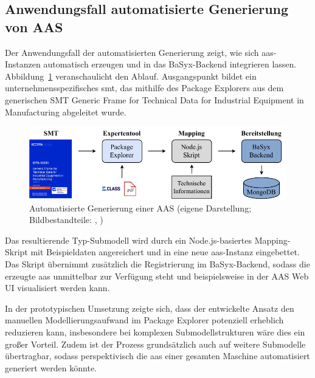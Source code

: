 \newpage
\subsection{Anwendungsfall automatisierte Generierung von AAS}

Der Anwendungsfall der automatisierten Generierung zeigt, wie sich \acs{aas}-Instanzen automatisch erzeugen und in das BaSyx-Backend integrieren lassen.
Abbildung~\ref{fig:AutomatisierteGenerierungAblauf} veranschaulicht den Ablauf.
Ausgangspunkt bildet ein unternehmensspezifisches \acs{smt}, das mithilfe des Package Explorers aus dem generischen SMT Generic Frame for Technical Data for Industrial Equipment in Manufacturing \cite{SpezifikaitonTechnischeDaten} abgeleitet wurde.

\begin{figure}[htbp]
    \centering
        \includegraphics[width=\textwidth]{Bilder/ErgebnisseAutomatisierteGenerierung/ARchitekturTest.pdf}
    \caption[Automatisierte Generierung einer AAS]{Automatisierte Generierung einer AAS (eigene Darstellung; Bildbestandteile: \cite{SpezifikaitonTechnischeDaten}, \cite{ECLASSLogo} )}
    \label{fig:AutomatisierteGenerierungAblauf}
\end{figure}
\vspace{-0.5em}

Das resultierende Typ-Submodell wird durch ein Node.js-basiertes Mapping-Skript mit Beispieldaten angereichert und in eine neue \acs{aas}-Instanz eingebettet. 
Das Skript übernimmt zusätzlich die Registrierung im BaSyx-Backend, sodass die erzeugte \acs{aas} unmittelbar zur Verfügung steht und beispielsweise in der AAS Web UI visualisiert werden kann.

In der prototypischen Umsetzung zeigte sich, dass der entwickelte Ansatz den manuellen Modellierungsaufwand im Package Explorer potenziell erheblich reduzieren kann, insbesondere bei komplexen Submodellstrukturen wäre dies ein großer Vorteil. 
Zudem ist der Prozess grundsätzlich auch auf weitere Submodelle übertragbar, sodass perspektivisch die \acs{aas} einer gesamten Maschine automatisiert generiert werden könnte. 

